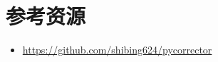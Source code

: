 \chapter{参考资源}

\begin{itemize}
\item \url{https://github.com/shibing624/pycorrector}
  
\end{itemize}